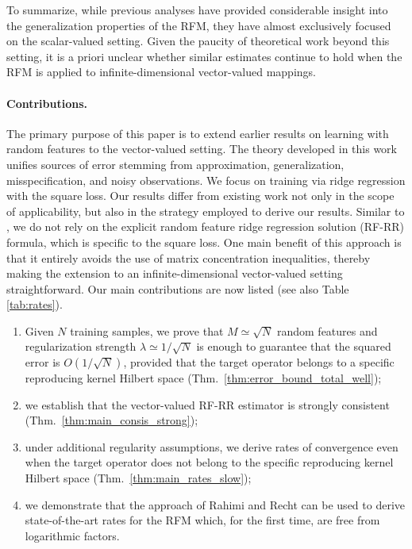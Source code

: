\documentclass{article}
\theoremstyle{plain}
\theoremstyle{my_def}
\theoremstyle{my_rem}
\numberwithin{equation}{section}
\numberwithin{theorem}{section}%
\begin{document}
To summarize, while previous analyses have provided considerable insight into the generalization properties of the RFM, they have almost exclusively focused on the scalar-valued setting. Given the paucity of theoretical work beyond this setting, it is a priori unclear whether similar estimates continue to hold when the RFM is applied to infinite-dimensional vector-valued mappings. 

\paragraph{Contributions.}
The primary purpose of this paper is to extend earlier results on learning with random features to the vector-valued setting. The theory developed in this work unifies sources of error stemming from approximation, generalization, misspecification, and noisy observations. We focus on training via ridge regression with the square loss. Our results differ from existing work not only in the scope of applicability, but also in the strategy employed to derive our results. Similar to \cite{RR2008}, we do not rely on the explicit random feature ridge regression solution (RF-RR) formula, which is specific to the square loss. One main benefit of this approach is that it entirely avoids the use of matrix concentration inequalities, thereby making the extension to an infinite-dimensional vector-valued setting straightforward. Our main contributions are now listed (see also Table \ref{tab:rates}).
\begin{enumerate}[label={(C\arabic*)}]
    \item \label{item:contr_TEMP} Given $N$ training samples, we prove that $M\simeq \sqrt{N}$ random features and regularization strength $\lambda\simeq 1/\sqrt{N}$ is enough to guarantee that the squared error is $O(1/\sqrt{N})$, provided that the target operator belongs to a specific reproducing kernel Hilbert space (Thm.~\ref{thm:error_bound_total_well});

    \item we establish that the vector-valued RF-RR estimator is strongly consistent (Thm.~\ref{thm:main_consis_strong});

    \item under additional regularity assumptions, we derive rates of convergence even when the target operator does not belong to the specific reproducing kernel Hilbert space (Thm.~\ref{thm:main_rates_slow});

    \item we demonstrate that the approach of Rahimi and Recht \cite{RR2008} can be used to derive state-of-the-art rates for the RFM which, for the first time, are free from logarithmic factors.
\end{enumerate}
\end{document}
